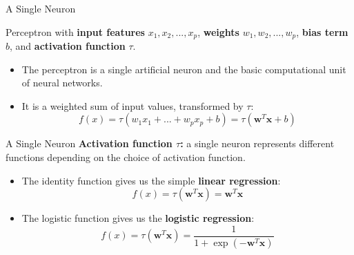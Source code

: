 \documentclass[11pt,compress,t,notes=noshow, xcolor=table]{beamer}
\begin{document}
\begin{vbframe} {A Single Neuron}
\vspace{-0.6cm}
\begin{figure}
\centering
{}
\end{figure}
\vspace{-1.8cm}
\footnotesize Perceptron %
with \textbf{input features} $x_1, x_2, ... ,x_p$, \textbf{weights} $w_1, w_2,... ,w_p$, \textbf{bias term} $b$, and \textbf{activation function} $\tau$.
\vspace{.2cm}
\normalsize
\begin{itemize}
\item The perceptron is a single artificial neuron and the basic computational unit of neural networks.
\vspace{.2cm}
\item It is a weighted sum of input values, transformed by $\tau$:
\vspace{-1mm}
$$f(x) = \tau(w_1x_1 + ... + w_px_p +  b) = \tau(\mathbf{w}^T \mathbf{x}+b)$$
\end{itemize}
\end{vbframe}

\begin{vbframe}{A Single Neuron}
\textbf{Activation function $\tau$:} a single neuron %
 represents different functions %
 depending on the choice of activation function.
\vspace{.5cm}
\begin{itemize}
\item The identity function gives us the simple \textbf{linear regression}:
$$f(x) = \tau(\mathbf{w}^T \mathbf{x}) = \mathbf{w}^T \mathbf{x}$$
\item The logistic function gives us the \textbf{logistic regression}:
$$f(x) = \tau(\mathbf{w}^T \mathbf{x}) = \frac{1}{1 + \exp(-\mathbf{w}^T \mathbf{x})}$$
\end{itemize}
\end{vbframe}
\end{document}
